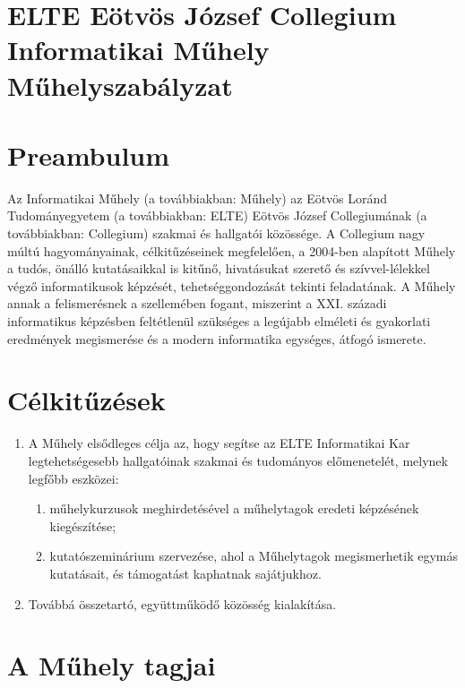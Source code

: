 \documentclass{../styles/rulebook}
\begin{document}
\section*{ELTE Eötvös József Collegium \\ Informatikai Műhely\\ \vspace{0.5em} Műhelyszabályzat}

\vspace{2em}

\section*{Preambulum}

Az Informatikai Műhely (a továbbiakban: Műhely) az Eötvös Loránd Tudományegyetem (a továbbiakban: ELTE) Eötvös József Collegiumának (a továbbiakban: Collegium) szakmai és hallgatói közössége.
A Collegium nagy múltú hagyományainak, célkitűzéseinek megfelelően, a 2004-ben alapított Műhely a tudós, önálló kutatásaikkal is kitűnő, hivatásukat szerető és szívvel-lélekkel végző informatikusok képzését, tehetséggondozását tekinti feladatának. A Műhely annak a felismerésnek a szellemében fogant, miszerint a XXI. századi informatikus képzésben feltétlenül szükséges a legújabb elméleti és gyakorlati eredmények megismerése és a modern informatika egységes, átfogó ismerete.

\section{Célkitűzések}

\begin{enumerate}
	\item A Műhely elsődleges célja az, hogy segítse az ELTE Informatikai Kar legtehetségesebb hallgatóinak szakmai és tudományos előmenetelét, melynek legfőbb eszközei:
	      \begin{enumerate}
		      \item műhelykurzusok meghirdetésével a műhelytagok eredeti képzésének kiegészítése;
		      \item kutatószeminárium szervezése, ahol a Műhelytagok megismerhetik egymás kutatásait, és támogatást kaphatnak sajátjukhoz.
	      \end{enumerate}
	\item Továbbá összetartó, együttműködő közösség kialakítása.
\end{enumerate}

\section{A Műhely tagjai}
\end{document}
